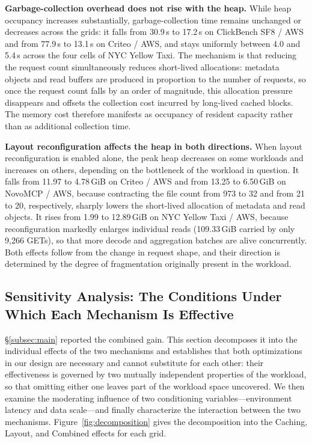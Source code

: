 \textbf{Garbage-collection overhead does not rise with the heap.}
While heap occupancy increases substantially, garbage-collection time remains
unchanged or decreases across the grids: it falls from 30.9\,s to 17.2\,s on
ClickBench SF8 / AWS and from 77.9\,s to 13.1\,s on Criteo / AWS, and stays
uniformly between 4.0 and 5.4\,s across the four cells of NYC Yellow Taxi. The
mechanism is that reducing the request count simultaneously reduces short-lived
allocations: metadata objects and read buffers are produced in proportion to the
number of requests, so once the request count falls by an order of magnitude,
this allocation pressure disappears and offsets the collection cost incurred by
long-lived cached blocks. The memory cost therefore manifests as occupancy of
resident capacity rather than as additional collection time.

\textbf{Layout reconfiguration affects the heap in both directions.}
When layout reconfiguration is enabled alone, the peak heap decreases on some
workloads and increases on others, depending on the bottleneck of the workload
in question. It falls from 11.97 to 4.78\,GiB on Criteo / AWS and from 13.25 to
6.50\,GiB on NovoMCP / AWS, because contracting the file count from 973 to 32
and from 21 to 20, respectively, sharply lowers the short-lived allocation of
metadata and read objects. It rises from 1.99 to 12.89\,GiB on NYC Yellow Taxi
/ AWS, because reconfiguration markedly enlarges individual reads (109.33\,GiB
carried by only 9{,}266 GETs), so that more decode and aggregation batches are
alive concurrently. Both effects follow from the change in request shape, and
their direction is determined by the degree of fragmentation originally present
in the workload.

\subsection{Sensitivity Analysis: The Conditions Under Which Each Mechanism Is Effective}
\label{subsec:sensitivity}

\S\ref{subsec:main} reported the combined gain. This section decomposes it into
the individual effects of the two mechanisms and establishes that both
optimizations in our design are necessary and cannot substitute for each other:
their effectiveness is governed by two mutually independent properties of the
workload, so that omitting either one leaves part of the workload space
uncovered. We then examine the moderating influence of two conditioning
variables---environment latency and data scale---and finally characterize the
interaction between the two mechanisms. Figure~\ref{fig:decomposition} gives the
decomposition into the Caching, Layout, and Combined effects for each grid.

